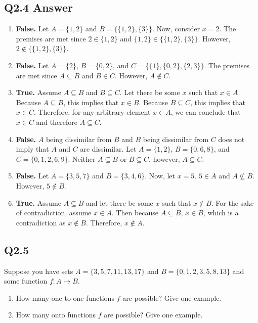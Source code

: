 \documentclass{article}
\begin{document}
\subsection*{Q2.4 Answer}
\begin{enumerate}[label=\alph*.]
\item \textbf{False.} Let \( A = \{1, 2\} \) and \( B = \{ \{1, 2\}, \{3\}\} \). Now, consider $x=2$. The premises are met since \( 2 \in \{1, 2\} \) and \( \{1, 2\} \in \{ \{1, 2\},\{3\}\} \). However, \( 2 \notin \{\{1, 2\},\{3\}\} \).
\item \textbf{False.} Let \( A = \{2\} \), \( B = \{0, 2\} \), and \( C = \{\{1\}, \{0, 2\}, \{2, 3\}\} \). The premises are met since $A\subseteq B$ and $B\in C$. However, \( A \notin C \).
\item \textbf{True.} Assume \( A \subseteq B \) and \( B \subseteq C \). Let there be some $x$ such that \( x \in A \). Because $A\subseteq B$, this implies that \( x \in B \). Because $B\subseteq C$, this implies that \( x \in C \). Therefore, for any arbitrary element $x\in A$, we can conclude that $x\in C$ and therefore \( A \subseteq C \).
\item \textbf{False.} $A$ being dissimilar from $B$ and $B$ being dissimilar from $C$ does not imply that $A$ and $C$ are dissimilar. Let \( A = \{1, 2\} \), \( B = \{0, 6, 8\} \), and \( C = \{0, 1, 2, 6, 9\} \). Neither $A\subseteq B$ or $B\subseteq C$, however, \( A \subseteq C \).
\item \textbf{False.} Let \( A = \{3, 5, 7\} \) and \( B = \{3, 4, 6\} \). Now, let $x=5$. \( 5 \in A \) and \( A \nsubseteq B \). However, \( 5 \notin B \).
\item \textbf{True.} Assume \( A \subseteq B \) and let there be some $x$ such that \( x \notin B \). For the sake of contradiction, assume \( x \in A \). Then because $A\subseteq B$, \( x \in B \), which is a contradiction as \( x \notin B \). Therefore, \( x \notin A \).
\end{enumerate}
\newpage

\subsection*{Q2.5}
Suppose you have sets $A=\{3,5,7,11,13,17\}$ and $B=\{0,1,2,3,5,8,13\}$ and some function $f:A\rightarrow B$.
\begin{enumerate}[label=\alph*.]
\item How many one-to-one functions $f$ are possible? Give one example.
\item How many onto functions $f$ are possible? Give one example.
\end{enumerate}
\newpage
\end{document}
